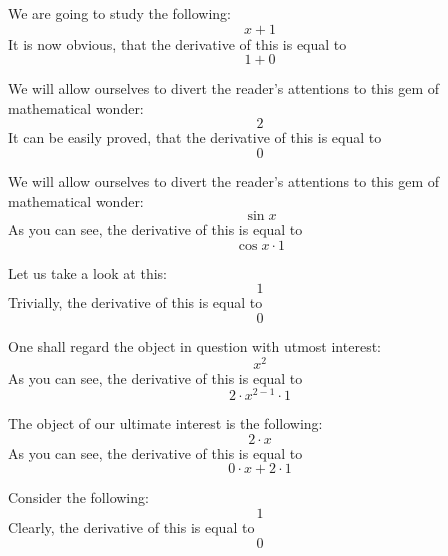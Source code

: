 \documentclass{article}
\begin{document}
We are going to study the following:
\begin{equation}
x + 1 
\end{equation}
It is now obvious, that the derivative of this is equal to
\begin{equation}
1 + 0 
\end{equation}

We will allow ourselves to divert the reader's attentions to this gem of mathematical wonder:
\begin{equation}
2 
\end{equation}
It can be easily proved, that the derivative of this is equal to
\begin{equation}
0 
\end{equation}

We will allow ourselves to divert the reader's attentions to this gem of mathematical wonder:
\begin{equation}
\sin x 
\end{equation}
As you can see, the derivative of this is equal to
\begin{equation}
\cos x \cdot 1 
\end{equation}

Let us take a look at this:
\begin{equation}
1 
\end{equation}
Trivially, the derivative of this is equal to
\begin{equation}
0 
\end{equation}

One shall regard the object in question with utmost interest:
\begin{equation}
x ^{2 } 
\end{equation}
As you can see, the derivative of this is equal to
\begin{equation}
2 \cdot x ^{2 - 1 } \cdot 1 
\end{equation}

The object of our ultimate interest is the following:
\begin{equation}
2 \cdot x 
\end{equation}
As you can see, the derivative of this is equal to
\begin{equation}
0 \cdot x + 2 \cdot 1 
\end{equation}

Consider the following:
\begin{equation}
1 
\end{equation}
Clearly, the derivative of this is equal to
\begin{equation}
0 
\end{equation}
\end{document}
